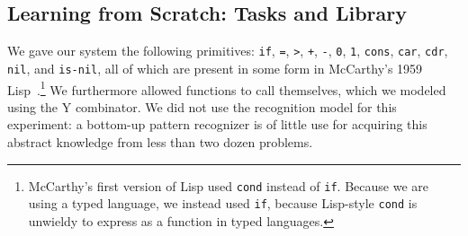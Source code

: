 \documentclass{article}
\newcommand{\code}[1]{{\footnotesize\texttt{#1}}}
\begin{document}
\subsection{Learning from Scratch: Tasks and Library}\label{appendixMcCarthy}

We gave our system the following primitives: \code{if}, \code{=},
\code{>}, \code{+}, \code{-}, \code{0}, \code{1}, \code{cons},
\code{car}, \code{cdr}, \code{nil}, and \code{is-nil}, all of which
are present in some form in McCarthy's 1959
Lisp~\cite{mccarthy1960recursive}.\footnote{McCarthy's first version
  of Lisp used \code{cond} instead of \code{if}. Because we are using
  a typed language, we instead used \code{if}, because Lisp-style
  \code{cond} is unwieldy to express as a function in typed
  languages.}  We furthermore allowed functions to call themselves,
which we modeled using the Y combinator.  We did not use the
recognition model for this experiment: a bottom-up pattern recognizer
is of little use for acquiring this abstract knowledge from less than
two dozen problems.
\end{document}
